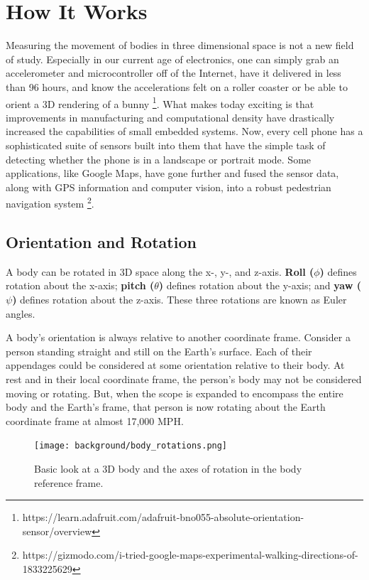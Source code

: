 \chapter{How  It Works}\label{chap:background}
Measuring the movement of bodies in three dimensional space is not a new field of study.
Especially in our current age of electronics, one can simply grab an accelerometer and microcontroller off of the Internet, have it delivered in less than 96 hours, and know the accelerations felt on a roller coaster or be able to orient a 3D rendering of a bunny \footnote[1]{https://learn.adafruit.com/adafruit-bno055-absolute-orientation-sensor/overview}.
What makes today exciting is that improvements in manufacturing and computational density have drastically increased the capabilities of small embedded systems.
Now, every cell phone has a sophisticated suite of sensors built into them that have the simple task of detecting whether the phone is in a landscape or portrait mode. 
Some applications, like Google Maps, have gone further and fused the sensor data, along with GPS information and computer vision, into a robust pedestrian navigation system \footnote[2]{https://gizmodo.com/i-tried-google-maps-experimental-walking-directions-of-1833225629}.

\section{Orientation and Rotation} \label{sec:bkg_orientation}
A body can be rotated in 3D space along the x-, y-, and z-axis.
\textbf{Roll ($\phi$)} defines rotation about the x-axis; \textbf{pitch ($\theta$)} defines rotation about the y-axis; and \textbf{yaw ($\psi$)} defines rotation about the z-axis.
These three rotations are known as Euler angles.

A body's orientation is always relative to another coordinate frame.
Consider a person standing straight and still on the Earth's surface.
Each of their appendages could be considered at some orientation relative to their body.
At rest and in their local coordinate frame, the person's body may not be considered moving or rotating.
But, when the scope is expanded to encompass the entire body and the Earth's frame, that person is now rotating about the Earth coordinate frame at almost 17,000 MPH.

\begin{figure}[h!]
    \caption[Body rotations]{Basic look at a 3D body and the axes of rotation in the body reference frame.}
    \label{fig:body_rotations}
    \centering
    \texttt{[image: background/body\_rotations.png]}
\end{figure}


